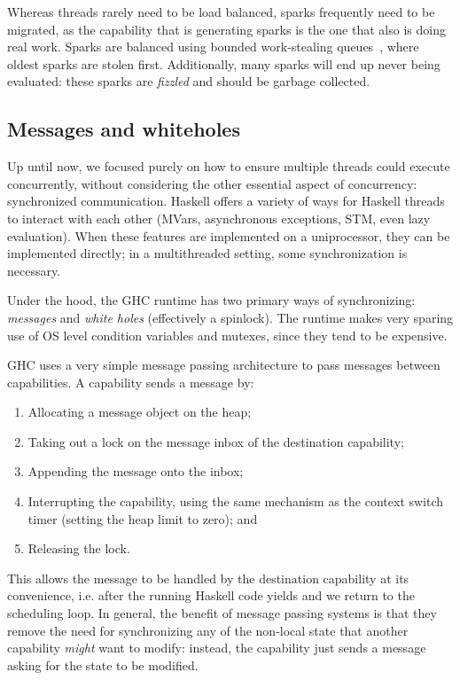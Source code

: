Whereas threads rarely need to be load balanced, sparks frequently need
to be migrated, as the capability that is generating
sparks is the one that also is doing real work.  Sparks are balanced using
bounded work-stealing queues~\XXX, where oldest sparks are stolen first.
Additionally, many sparks will end up never being evaluated: these sparks
are \emph{fizzled} and should be garbage collected. 

\subsection{Messages and whiteholes}

Up until now, we focused purely on how to ensure multiple threads could
execute concurrently, without considering the other essential aspect of
concurrency: synchronized communication.  Haskell offers a variety of
ways for Haskell threads to interact with each other (MVars,
asynchronous exceptions, STM, even lazy evaluation).  When these features
are implemented on a uniprocessor, they can be implemented directly;
in a multithreaded setting, some synchronization is necessary.

Under the hood, the GHC runtime has two primary ways of synchronizing:
\emph{messages} and \emph{white holes} (effectively a spinlock).  The
runtime makes very sparing use of OS level condition variables and
mutexes, since they tend to be expensive.

GHC uses a very simple message passing architecture to pass messages
between capabilities.  A capability sends a message by:

\begin{enumerate}
    \item Allocating a message object on the heap;
    \item Taking out a lock on the message inbox of the destination capability;
    \item Appending the message onto the inbox;
    \item Interrupting the capability, using the same mechanism as the context switch timer (setting the heap limit to zero); and
    \item Releasing the lock.
\end{enumerate}

This allows the message to be handled by the destination capability at
its convenience, i.e. after the running Haskell code yields and we
return to the scheduling loop.  In general, the benefit of message
passing systems is that they remove the need for synchronizing any of
the non-local state that another capability \emph{might} want to modify: instead,
the capability just sends a message asking for the state to be modified.

